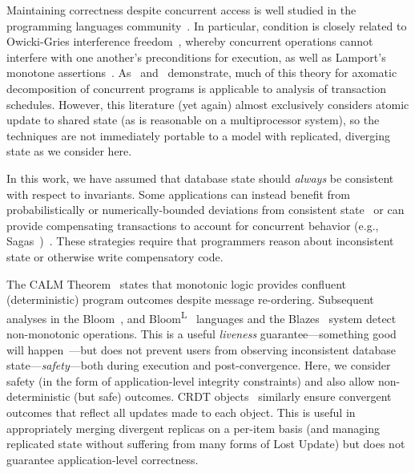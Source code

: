  Maintaining correctness despite concurrent
access is well studied in the programming languages
community~\cite{schneider-correctness}. In particular, \iconfluence
condition is closely related to Owicki-Gries interference
freedom~\cite{owickigries}, whereby concurrent operations cannot
interfere with one another's preconditions for execution, as well as
Lamport's monotone
assertions~\cite{lamport-safety}. As~\cite{decomp-semantics}
and~\cite{agarwal-consistency} demonstrate, much of this theory for
axomatic decomposition of concurrent programs is applicable to
analysis of transaction schedules. However, this literature (yet
again) almost exclusively considers atomic update to shared state (as
is reasonable on a multiprocessor system), so the techniques are not
immediately portable to a model with replicated, diverging state as we
consider here.

 In this work, we have assumed that
database state should \textit{always} be consistent with respect to
invariants. Some applications can instead benefit from
probabilistically or numerically-bounded deviations from consistent
state~\cite{epsilon-divergence} or can provide compensating
transactions to account for concurrent behavior (e.g.,
Sagas~\cite{sagas})~\cite{ic-survey,ic-survey-two}. These strategies
require that programmers reason about inconsistent state or otherwise
write compensatory code.

 The CALM
Theorem~\cite{ameloot-calm} states that monotonic logic provides
confluent (deterministic) program outcomes despite message
re-ordering. Subsequent analyses in the Bloom~\cite{calm}, and
Bloom\textsuperscript{L}~\cite{blooml} languages and the
Blazes~\cite{blazes} system detect non-monotonic operations. This is a
useful \textit{liveness} guarantee---something good will
happen~\cite{lamport-safety}---but does not prevent users from
observing inconsistent database state---\textit{safety}---both during
execution and post-convergence. Here, we consider safety (in the form
of application-level integrity constraints) and also allow
non-deterministic (but safe) outcomes. CRDT objects~\cite{crdt}
similarly ensure convergent outcomes that reflect all updates made to
each object. This is useful in appropriately merging divergent
replicas on a per-item basis (and managing replicated state without
suffering from many forms of Lost Update) but does not guarantee
application-level correctness.


